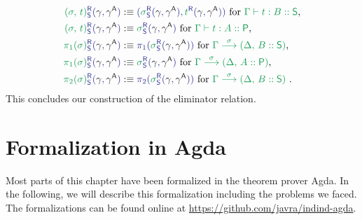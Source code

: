 \begin{defn}
\begin{align*}
\tqm{\grm{(\sigma,\,t)}^\RR_\Sc(\blgamma, \blgammaCC)}
  &:\equiv \tqm{(\grm{\sigma}^\RR_\Sc(\blgamma, \blgammaCC) , \grm{t}^\RR(\blgamma, \blgammaCC))}
    \text{ for \grm{\Gamma \vdash t : B :: \Sc},} \\
\tqm{\grm{(\sigma,\,t)}^\RR_\Sc(\blgamma, \blgammaCC)}
  &:\equiv \tqm{\grm{\sigma}^\RR_\Sc(\blgamma, \blgammaCC)} \text{ for \grm{\Gamma \vdash t : A :: \Pc},} \\
\tqm{\grm{\pi_1(\sigma)}^\RR_\Sc(\blgamma, \blgammaCC)}
  &:\equiv \tqm{\pi_1(\grm{\sigma}^\RR_\Sc(\blgamma, \blgammaCC))} \text{ for \grm{\IISub{\sigma}{\Gamma}{(\Delta,\, B :: \Sc)}},} \\
\tqm{\grm{\pi_1(\sigma)}^\RR_\Sc(\blgamma, \blgammaCC)}
  &:\equiv \tqm{\grm{\sigma}^\RR_\Sc(\blgamma, \blgammaCC)} \text{ for \grm{\IISub{\sigma}{\Gamma}{(\Delta,\, A :: \Pc)}},} \\
\tqm{\grm{\pi_2(\sigma)}^\RR_\Sc(\blgamma, \blgammaCC)}
  &:\equiv \tqm{\pi_2(\grm{\sigma}^\RR_\Sc(\blgamma, \blgammaCC))} \text{ for \grm{\IISub{\sigma}{\Gamma}{(\Delta ,\, B :: \Sc)}} .}
\end{align*}
This concludes our construction of the eliminator relation.
\end{defn}

\section{Formalization in Agda}

Most parts of this chapter have been formalized in the theorem prover Agda.
In the following, we will describe this formalization including the problems we faced.
The formalizations can be found online at \url{https://github.com/javra/indind-agda}.


